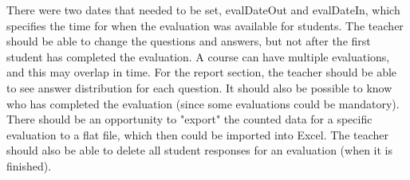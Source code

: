 There were two dates that needed to be set, evalDateOut and evalDateIn, which specifies the time for when the evaluation was available for students. 
The teacher should be able to change the questions and answers, but not after the first student has completed the evaluation.
A course can have multiple evaluations, and this may overlap in time. 
\vspace{0.5em}\newline
For the report section, the teacher should be able to see answer distribution for each question. 
It should also be possible to know who has completed the evaluation (since some evaluations could be mandatory).
There should be an opportunity to "export" the counted data for a specific evaluation to a flat file, which then could be imported into Excel. 
The teacher should also be able to delete all student responses for an evaluation (when it is finished).

